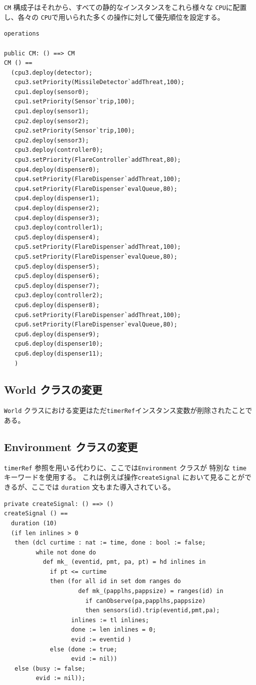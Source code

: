 \documentclass[\pformat,12pt]{jreport}
\begin{document}
\texttt{CM} 構成子はそれから、すべての静的なインスタンスをこれら様々な \texttt{CPU}に配置し、各々の \texttt{CPU}で用いられた多くの操作に対して優先順位を設定する。

\begin{lstlisting}
operations

public CM: () ==> CM
CM () ==
  (cpu3.deploy(detector);
   cpu3.setPriority(MissileDetector`addThreat,100);
   cpu1.deploy(sensor0);
   cpu1.setPriority(Sensor`trip,100);
   cpu1.deploy(sensor1);
   cpu2.deploy(sensor2);
   cpu2.setPriority(Sensor`trip,100);
   cpu2.deploy(sensor3);
   cpu3.deploy(controller0);
   cpu3.setPriority(FlareController`addThreat,80);
   cpu4.deploy(dispenser0);
   cpu4.setPriority(FlareDispenser`addThreat,100);
   cpu4.setPriority(FlareDispenser`evalQueue,80);
   cpu4.deploy(dispenser1);
   cpu4.deploy(dispenser2);
   cpu4.deploy(dispenser3);
   cpu3.deploy(controller1);
   cpu5.deploy(dispenser4);
   cpu5.setPriority(FlareDispenser`addThreat,100);
   cpu5.setPriority(FlareDispenser`evalQueue,80);
   cpu5.deploy(dispenser5);
   cpu5.deploy(dispenser6);
   cpu5.deploy(dispenser7);
   cpu3.deploy(controller2);
   cpu6.deploy(dispenser8);
   cpu6.setPriority(FlareDispenser`addThreat,100);
   cpu6.setPriority(FlareDispenser`evalQueue,80);
   cpu6.deploy(dispenser9);
   cpu6.deploy(dispenser10);
   cpu6.deploy(dispenser11);
   )
\end{lstlisting}

\subsection{World クラスの変更}

 \texttt{World} クラスにおける変更はただ\texttt{timerRef}インスタンス変数が削除されたことである。

\subsection{Environment クラスの変更}

\texttt{timerRef} 参照を用いる代わりに、ここでは\texttt{Environment} クラスが 特別な \texttt{time}キーワードを使用する。
これは例えば操作\texttt{createSignal} において見ることができるが、ここでは \texttt{duration} 文もまた導入されている。

\begin{lstlisting}
private createSignal: () ==> ()
createSignal () ==
  duration (10) 
  (if len inlines > 0
   then (dcl curtime : nat := time, done : bool := false;
         while not done do
           def mk_ (eventid, pmt, pa, pt) = hd inlines in
             if pt <= curtime
             then (for all id in set dom ranges do
                     def mk_(papplhs,pappsize) = ranges(id) in
                       if canObserve(pa,papplhs,pappsize)
                       then sensors(id).trip(eventid,pmt,pa);
                   inlines := tl inlines;
                   done := len inlines = 0;
                   evid := eventid )
             else (done := true;
                   evid := nil))
   else (busy := false;
         evid := nil));
\end{lstlisting}
\end{document}

